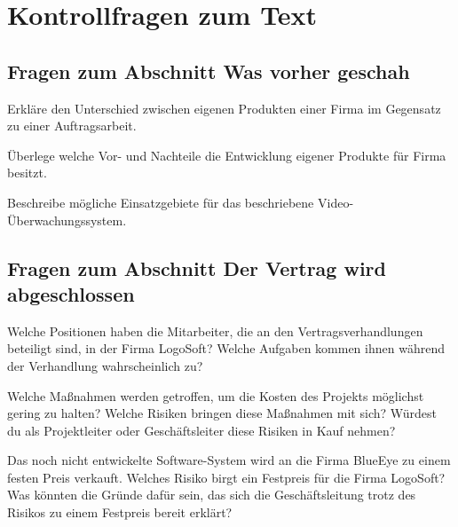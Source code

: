 \clearpage

\rehead[]{\textcolor{lightblue}{AvHG, Inf, My}}
\lohead[]{\textcolor{lightblue}{AvHG, Inf, My}}

\section{Kontrollfragen zum Text}

\subsection*{Fragen zum Abschnitt \glqq Was vorher geschah\grqq}
\begin{compactenum}[a)]
\item Erkläre den Unterschied zwischen eigenen Produkten einer Firma im
Gegensatz zu einer Auftragsarbeit.
\item Überlege welche Vor- und Nachteile die Entwicklung eigener Produkte für
Firma besitzt.
\item Beschreibe mögliche Einsatzgebiete für das beschriebene
Video-Überwachungssystem.
\end{compactenum}

\subsection*{Fragen zum Abschnitt \glqq Der Vertrag wird abgeschlossen\grqq}
\begin{compactenum}[a)]
\item Welche Positionen haben die Mitarbeiter, die an den Vertragsverhandlungen
beteiligt sind, in der Firma LogoSoft? Welche Aufgaben kommen ihnen während der
Verhandlung wahrscheinlich zu? 
\item Welche Maßnahmen werden getroffen, um die Kosten des Projekts möglichst
gering zu halten? Welche Risiken bringen diese Maßnahmen mit sich? Würdest du
als Projektleiter oder Geschäftsleiter diese Risiken in Kauf nehmen?
\item Das noch nicht entwickelte Software-System wird an die Firma BlueEye zu
einem festen Preis verkauft. Welches Risiko birgt ein Festpreis für die Firma
LogoSoft? Was könnten die Gründe dafür sein, das sich die Geschäftsleitung
trotz des Risikos zu einem Festpreis bereit erklärt?
\end{compactenum}

